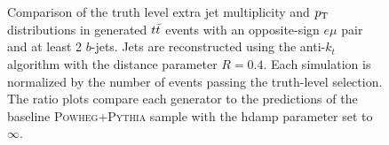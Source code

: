 \begin{figure}
\centering
{}
~
 \\
 ~
\caption{Comparison of the truth level extra jet multiplicity and $p_{\text{T}}$ distributions in generated $t\bar{t}$ events with an opposite-sign $e\mu$ pair and at least 2 $b$-jets.  Jets are reconstructed using the anti-$k_t$ algorithm with 
the distance parameter $R=0.4$.
Each simulation is normalized by the number of events passing the truth-level selection.
The ratio plots compare each generator to the predictions of the baseline \textsc{ Powheg+Pythia} sample with the hdamp parameter
set to $\infty$.}
\label{fig:introtjets}
\end{figure}

